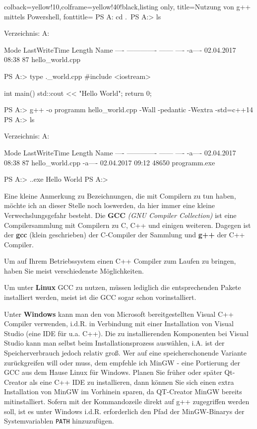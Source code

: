 \documentclass[a4paper]{report}
\begin{document}
\begin{tcblisting}{colback=yellow!10,colframe=yellow!40!black,listing only,
		title=Nutzung von g++ mittels Powershell, fonttitle=\bfseries}
PS A:\> cd .\example\
PS A:\example> ls


Verzeichnis: A:\example


Mode                LastWriteTime         Length Name
----                -------------         ------ ----
-a----       02.04.2017     08:38             87 hello_world.cpp


PS A:\example> type .\hello_world.cpp
#include <iostream>

int main(){
	std::cout << "Hello World";
	return 0;
}

PS A:\example> g++ -o programm hello_world.cpp -Wall -pedantic -Wextra -std=c++14
PS A:\example> ls


Verzeichnis: A:\example


Mode                LastWriteTime         Length Name
----                -------------         ------ ----
-a----       02.04.2017     08:38             87 hello_world.cpp
-a----       02.04.2017     09:12          48650 programm.exe


PS A:\example> .\programm.exe
Hello World
PS A:\example>
\end{tcblisting}

Eine kleine Anmerkung zu Bezeichnungen, die mit Compilern zu tun haben, möchte ich an dieser Stelle noch loswerden, da hier immer eine kleine Verwechslungsgefahr besteht. Die \textbf{GCC} \textit{(GNU Compiler Collection)} ist eine Compilersammlung mit Compilern zu C, C++ und einigen weiteren. Dagegen ist der \textbf{gcc} (klein geschrieben) der C-Compiler der Sammlung und \textbf{g++} der C++ Compiler.

Um auf Ihrem Betriebssystem einen C++ Compiler zum Laufen zu bringen, haben Sie meist verschiedenste Möglichkeiten.

Um unter \textbf{Linux} GCC zu nutzen, müssen lediglich die entsprechenden Pakete installiert werden, meist ist die GCC sogar schon vorinstalliert.

Unter \textbf{Windows} kann man den von Microsoft bereitgestellten Visual C++ Compiler verwenden, i.d.R. in Verbindung mit einer Installation von Visual Studio (eine IDE für u.a. C++). Die zu installierenden Komponenten bei Visual Studio kann man selbst beim Installationsprozess auswählen, i.A. ist der Speicherverbrauch jedoch relativ groß. Wer auf eine speicherschonende Variante zurückgreifen will oder muss, dem empfehle ich MinGW - eine Portierung der GCC aus dem Hause Linux für Windows. Planen Sie früher oder später Qt-Creator als eine C++ IDE zu installieren, dann können Sie sich einen extra Installation von MinGW im Vorhinein sparen, da QT-Creator MinGW bereits mitinstalliert. Sofern mit der Kommandozeile direkt auf g++ zugegriffen werden soll, ist es unter Windows i.d.R. erforderlich den Pfad der MinGW-Binarys der Systemvariablen \texttt{PATH} hinzuzufügen.
\end{document}
